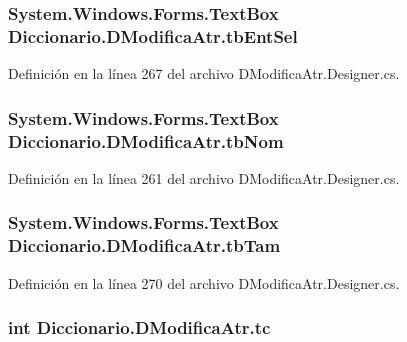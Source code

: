 \hypertarget{class_diccionario_1_1_d_modifica_atr_ababb862ae620c6e1e83641b83ab9f2d8}{
\subsubsection[{tb\-Ent\-Sel}]{\setlength{\rightskip}{0pt plus 5cm}System.\-Windows.\-Forms.\-Text\-Box Diccionario.\-D\-Modifica\-Atr.\-tb\-Ent\-Sel}}\label{class_diccionario_1_1_d_modifica_atr_ababb862ae620c6e1e83641b83ab9f2d8}


Definición en la línea 267 del archivo D\-Modifica\-Atr.\-Designer.\-cs.

\hypertarget{class_diccionario_1_1_d_modifica_atr_a79eef6fea893d55e4b8a66332f8cb0e5}{
\subsubsection[{tb\-Nom}]{\setlength{\rightskip}{0pt plus 5cm}System.\-Windows.\-Forms.\-Text\-Box Diccionario.\-D\-Modifica\-Atr.\-tb\-Nom}}\label{class_diccionario_1_1_d_modifica_atr_a79eef6fea893d55e4b8a66332f8cb0e5}


Definición en la línea 261 del archivo D\-Modifica\-Atr.\-Designer.\-cs.

\hypertarget{class_diccionario_1_1_d_modifica_atr_a877a19710cd26a5fb06c38f02df46b97}{
\subsubsection[{tb\-Tam}]{\setlength{\rightskip}{0pt plus 5cm}System.\-Windows.\-Forms.\-Text\-Box Diccionario.\-D\-Modifica\-Atr.\-tb\-Tam}}\label{class_diccionario_1_1_d_modifica_atr_a877a19710cd26a5fb06c38f02df46b97}


Definición en la línea 270 del archivo D\-Modifica\-Atr.\-Designer.\-cs.

\hypertarget{class_diccionario_1_1_d_modifica_atr_af4846e255edc43368622e4137dd67c01}{
\subsubsection[{tc}]{\setlength{\rightskip}{0pt plus 5cm}int Diccionario.\-D\-Modifica\-Atr.\-tc}}\label{class_diccionario_1_1_d_modifica_atr_af4846e255edc43368622e4137dd67c01}


